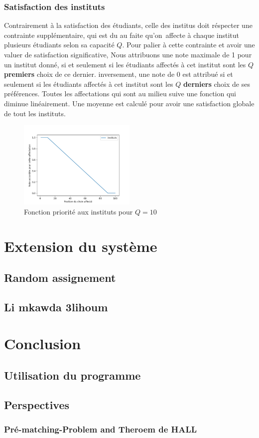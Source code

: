 \documentclass[12pt,titlepage]{article}
\begin{document}
\subsubsection*{Satisfaction des instituts}
Contrairement à la satisfaction des étudiants, celle des institus doit réspecter une contrainte supplémentaire, qui est du au faite qu'on affecte à chaque institut plusieurs étudiants selon sa capacité $Q$. Pour palier à cette contrainte et avoir une valuer de satisfaction significative, Nous attribuons une note maximale de 1 pour un institut donné, si et seulement si les étudiants affectés à cet institut sont les $Q$ \textbf{premiers} choix de ce dernier. inversement, une note de 0 est attribué si et seulement si les étudiants affectés à cet institut sont les $Q$ \textbf{derniers} choix de ses préférences. Toutes les affectations qui sont au milieu suive une fonction qui diminue linéairement. Une moyenne est calculé pour avoir une satisfaction globale de tout les instituts.


\begin{figure}[!h]
  \centering
  \includegraphics[width = 0.5\textwidth]{img/instituts.png}
  \caption{Fonction priorité aux instituts pour $Q = 10$}
\end{figure}

\begin{figure}
  
\end{figure}


\section{Extension du système}

\subsection{Random assignement}

\subsection{Li mkawda 3lihoum}

\section{Conclusion}

\subsection{Utilisation du programme}


\subsection{Perspectives}

\subsubsection{Pré-matching-Problem and Theroem de HALL}
\end{document}
